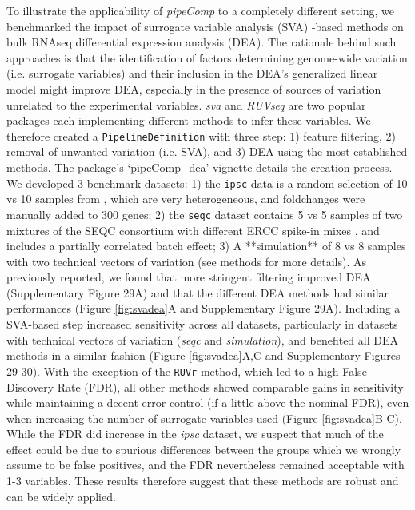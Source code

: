 \documentclass{bmcart}
\begin{document}
To illustrate the applicability of \textit{pipeComp} to a completely different setting, we benchmarked the impact of surrogate variable analysis (SVA) -based methods on bulk RNAseq differential expression analysis (DEA). The rationale behind such approaches is that the identification of factors determining genome-wide variation (i.e. surrogate variables) and their inclusion in the DEA's generalized linear model might improve DEA, especially in the presence of sources of variation unrelated to the experimental variables. \textit{sva}\citep{leekCapturingHeterogeneityGene2007,leekSvaPackageRemoving2012} and \textit{RUVseq}\citep{rissoNormalizationRNAseq2014a} are two popular packages each implementing different methods to infer these variables. We therefore created a \texttt{PipelineDefinition} with three step: 1) feature filtering, 2) removal of unwanted variation (i.e. SVA), and 3) DEA using the most established methods. The package's `pipeComp\_dea' vignette details the creation process. We developed 3 benchmark datasets: 1) the \texttt{ipsc} data is a random selection of 10 vs 10 samples from \citet{carcamoOriveAnalysisTranscriptional2017}, which are very heterogeneous, and foldchanges were manually added to 300 genes; 2) the \texttt{seqc} dataset contains 5 vs 5 samples of two mixtures of the SEQC consortium with different ERCC spike-in mixes \citep{ComprehensiveAssessment2014}, and includes a partially correlated batch effect; 3) A **simulation** of 8 vs 8 samples with two technical vectors of variation (see methods for more details). As previously reported, we found that more stringent filtering improved DEA (Supplementary Figure 29A) and that the different DEA methods had similar performances (Figure \ref{fig:svadea}A and Supplementary Figure 29A). Including a SVA-based step increased sensitivity across all datasets, particularly in datasets with technical vectors of variation (\textit{seqc} and \textit{simulation}), and benefited all DEA methods in a similar fashion (Figure \ref{fig:svadea}A,C and Supplementary Figures 29-30). With the exception of the \texttt{RUVr} method, which led to a high False Discovery Rate (FDR), all other methods showed comparable gains in sensitivity while maintaining a decent error control (if a little above the nominal FDR), even when increasing the number of surrogate variables used (Figure \ref{fig:svadea}B-C). While the FDR did increase in the \textit{ipsc} dataset, we suspect that much of the effect could be due to spurious differences \citep{germainTamingHumanGenetic2017} between the groups which we wrongly assume to be false positives, and the FDR nevertheless remained acceptable with 1-3 variables. These results therefore suggest that these methods are robust and can be widely applied.
\end{document}
